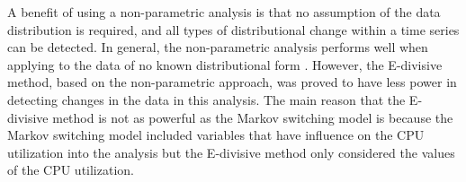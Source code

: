 A benefit of using a non-parametric analysis is that no assumption
of the data distribution is required, and all types of distributional
change within a time series can be detected. In general, the non-parametric
analysis performs well when applying to the data of no known distributional
form \citep{sharkey2014nonparametric}. However, the E-divisive method,
based on the non-parametric approach, was proved to have less power
in detecting changes in the data in this analysis. The main reason
that the E-divisive method is not as powerful as the Markov switching
model is because the Markov switching model included variables that
have influence on the CPU utilization into the analysis but the E-divisive
method only considered the values of the CPU utilization. %
\begin{comment}
Note that when the Markov switching model was performed, variables
that have influences on the CPU utilization were also included in
the model. On the other hand, the E-divisive method only considered
the values of the CPU utilization. With this difference, the E-divisive
method will have less power to identify actual changes in the CPU
utilization. Since there are other variables that affect the value
of the CPU utilization, it is insufficient to take into account only
the response variable.
\end{comment}
{} %
\begin{comment}
The E-divisive method appears to perform reasonably well in detecting
changes as far as a non-parametric analysis could. As can be seen
from \ref{subsec:Real-data}, the method is able to detect when a
change is happened around the same time as the Markov switching model
did. Even though the E-divisive method might not provide the best
result, it can give a general idea of estimated change points.
\end{comment}


